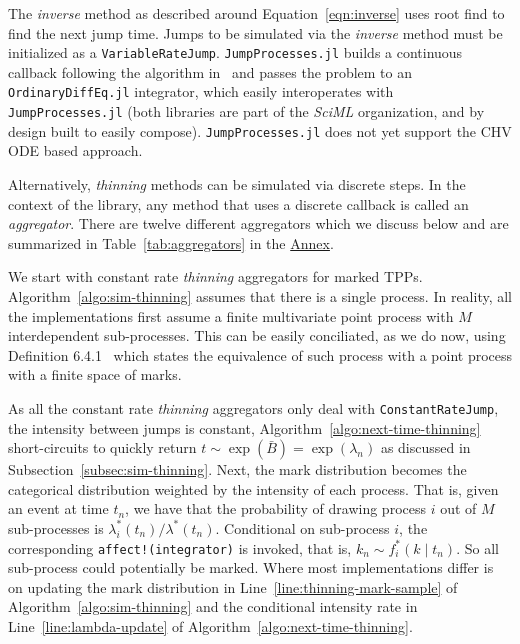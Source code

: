 \documentclass{juliacon}
\numberwithin{equation}{section}
\begin{document}
The \textit{inverse} method as described around Equation~\ref{eqn:inverse} uses root find to find the next jump time. Jumps to be simulated via the \textit{inverse} method must be initialized as a \texttt{VariableRateJump}. \texttt{JumpProcesses.jl} builds a continuous callback following the algorithm in~\cite{salis2005} and passes the problem to an \texttt{OrdinaryDiffEq.jl} integrator, which easily interoperates with \texttt{JumpProcesses.jl} (both libraries are part of the \textit{SciML} organization, and by design built to easily compose). \texttt{JumpProcesses.jl} does not yet support the CHV ODE based approach.

Alternatively, \textit{thinning} methods can be simulated via discrete steps. In the context of the library, any method that uses a discrete callback is called an \textit{aggregator}. There are twelve different aggregators which we discuss below and are summarized in Table~\ref{tab:aggregators} in the \hyperref[sec:annex]{Annex}.

We start with constant rate \textit{thinning} aggregators for marked TPPs. Algorithm~\ref{algo:sim-thinning} assumes that there is a single process. In reality, all the implementations first assume a finite multivariate point process with \( M \) interdependent sub-processes. This can be easily conciliated, as we do now, using Definition 6.4.1~\cite{daley2003} which states the equivalence of such process with a point process with a finite space of marks. 

As all the constant rate \textit{thinning} aggregators only deal with \texttt{ConstantRateJump}, the intensity between jumps is constant, Algorithm~\ref{algo:next-time-thinning} short-circuits to quickly return \( t \sim \exp(\bar{B}) = \exp(\lambda_n) \) as discussed in Subsection~\ref{subsec:sim-thinning}. Next, the mark distribution becomes the categorical distribution weighted by the intensity of each process. That is, given an event at time \( t_n \), we have that the probability of drawing process \( i \) out of \( M \) sub-processes is \( \lambda_i^\ast (t_n)  / \lambda^\ast (t_n) \). Conditional on sub-process \( i \), the corresponding \texttt{affect!(integrator)} is invoked, that is, \( k_n \sim f_i^\ast (k \mid t_n) \). So all sub-process could potentially be marked. Where most implementations differ is on updating the mark distribution in Line~\ref{line:thinning-mark-sample} of Algorithm~\ref{algo:sim-thinning} and the conditional intensity rate in Line~\ref{line:lambda-update} of Algorithm~\ref{algo:next-time-thinning}. 
\end{document}
